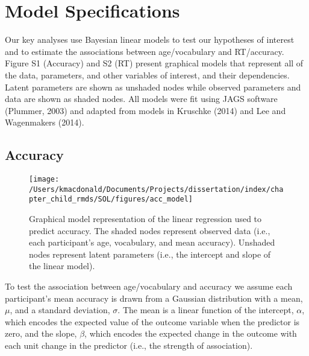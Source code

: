 \documentclass[oneside]{report}
\begin{document}
\hypertarget{model-specifications}{%
\section{Model Specifications}\label{model-specifications}}

Our key analyses use Bayesian linear models to test our hypotheses of
interest and to estimate the associations between age/vocabulary and
RT/accuracy. Figure S1 (Accuracy) and S2 (RT) present graphical models
that represent all of the data, parameters, and other variables of
interest, and their dependencies. Latent parameters are shown as
unshaded nodes while observed parameters and data are shown as shaded
nodes. All models were fit using JAGS software (Plummer, 2003) and
adapted from models in Kruschke (2014) and Lee and Wagenmakers (2014).

\hypertarget{accuracy}{%
\subsection{Accuracy}\label{accuracy}}
\begin{figure}[t]

{\centering \texttt{[image: /Users/kmacdonald/Documents/Projects/dissertation/index/chapter\_child\_rmds/SOL/figures/acc\_model]} 

}

\caption[Graphical representation of the accuracy model.]{Graphical model representation of the linear regression used to predict accuracy. The shaded nodes represent observed data (i.e., each participant's age, vocabulary, and mean accuracy). Unshaded nodes represent latent parameters (i.e., the intercept and slope of the linear model).}\label{fig:unnamed-chunk-7}
\end{figure}
To test the association between age/vocabulary and accuracy we assume
each participant's mean accuracy is drawn from a Gaussian distribution
with a mean, \(\mu\), and a standard deviation, \(\sigma\). The mean is
a linear function of the intercept, \(\alpha\), which encodes the
expected value of the outcome variable when the predictor is zero, and
the slope, \(\beta\), which encodes the expected change in the outcome
with each unit change in the predictor (i.e., the strength of
association).
\end{document}
